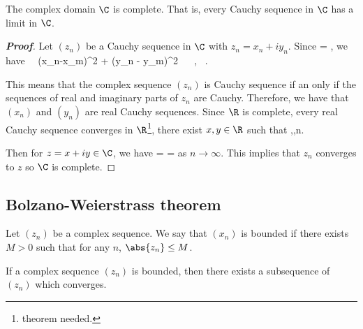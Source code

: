\begin{theorem}\label{thm:complex_plane_is_complete}%
The complex domain $\C$ is complete. That is, every Cauchy sequence in $\C$ has a limit in $\C$.
\end{theorem}

\begin{proof}[\bf Proof]
Let $(z_n)$ be a Cauchy sequence in $\C$ with $z_n = x_n + iy_n$. Since
\be
{} =  ,
\ee
we have
\be
{}  \ \lra\ (x_n-x_m)^2 + (y_n - y_m)^2  \ \lra\  ,\  .
\ee

This means that the complex sequence $(z_n)$ is Cauchy sequence if an only if the sequences of real and imaginary parts of $z_n$ are Cauchy. Therefore, we have that $(x_n)$ and $(y_n)$ are real Cauchy sequences. Since $\R$ is complete, every real Cauchy sequence converges in $\R$\footnote{theorem needed.}, there exist $x,y\in \R$ such that
\be
{} ,\quad {},\qquad{}n\to \infty.
\ee

Then for $z = x+iy \in \C$, we have
\be
{} =  =  
\ee
as $n\to \infty$. This implies that $z_n$ converges to $z$ so $\C$ is complete.
\end{proof}

\subsection{Bolzano-Weierstrass theorem}

\begin{definition}
Let $(z_n)$ be a complex sequence. We say that $(x_n)$ is bounded if there exists $M>0$ such that for any $n$, $\abs{z_n}\leq M$.
\end{definition}

\begin{theorem}\label{thm:bolzano_weierstrass_complex}
If a complex sequence $(z_n)$ is bounded, then there exists a subsequence of $(z_n)$ which converges.
\end{theorem}


